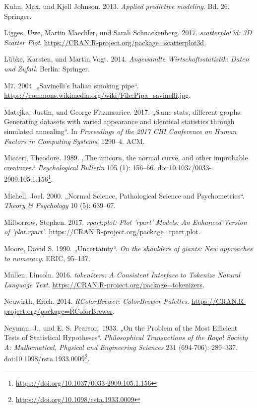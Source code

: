 \documentclass[12pt,ngerman,]{book}
\let\rmarkdownfootnote\footnote%
\def\footnote{\protect\rmarkdownfootnote}
\renewcommand{\href}[2]{#2\footnote{\url{#1}}}
\theoremstyle{definition}
\theoremstyle{definition}
\theoremstyle{remark}
\begin{document}
\hypertarget{ref-kuhn2013applied}{}
Kuhn, Max, und Kjell Johnson. 2013. \emph{Applied predictive modeling}.
Bd. 26. Springer.

\hypertarget{ref-R-scatterplot3d}{}
Ligges, Uwe, Martin Maechler, und Sarah Schnackenberg. 2017.
\emph{scatterplot3d: 3D Scatter Plot}.
\url{https://CRAN.R-project.org/package=scatterplot3d}.

\hypertarget{ref-lubke2014angewandte}{}
Lübke, Karsten, und Martin Vogt. 2014. \emph{Angewandte
Wirtschaftsstatistik: Daten und Zufall}. Berlin: Springer.

\hypertarget{ref-m7_savinellis_2004}{}
M7. 2004. „Savinelli's Italian smoking pipe``.
\url{https://commons.wikimedia.org/wiki/File:Pipa_savinelli.jpg}.

\hypertarget{ref-matejka2017same}{}
Matejka, Justin, und George Fitzmaurice. 2017. „Same stats, different
graphs: Generating datasets with varied appearance and identical
statistics through simulated annealing``. In \emph{Proceedings of the
2017 CHI Conference on Human Factors in Computing Systems}, 1290--4.
ACM.

\hypertarget{ref-Micceri1989}{}
Micceri, Theodore. 1989. „The unicorn, the normal curve, and other
improbable creatures.`` \emph{Psychological Bulletin} 105 (1): 156--66.
doi:\href{https://doi.org/10.1037/0033-2909.105.1.156}{10.1037/0033-2909.105.1.156}.

\hypertarget{ref-Michell2000}{}
Michell, Joel. 2000. „Normal Science, Pathological Science and
Psychometrics``. \emph{Theory \& Psychology} 10 (5): 639--67.

\hypertarget{ref-R-rpart.plot}{}
Milborrow, Stephen. 2017. \emph{rpart.plot: Plot 'rpart' Models: An
Enhanced Version of 'plot.rpart'}.
\url{https://CRAN.R-project.org/package=rpart.plot}.

\hypertarget{ref-moore1990uncertainty}{}
Moore, David S. 1990. „Uncertainty``. \emph{On the shoulders of giants:
New approaches to numeracy}. ERIC, 95--137.

\hypertarget{ref-R-tokenizers}{}
Mullen, Lincoln. 2016. \emph{tokenizers: A Consistent Interface to
Tokenize Natural Language Text}.
\url{https://CRAN.R-project.org/package=tokenizers}.

\hypertarget{ref-R-RColorBrewer}{}
Neuwirth, Erich. 2014. \emph{RColorBrewer: ColorBrewer Palettes}.
\url{https://CRAN.R-project.org/package=RColorBrewer}.

\hypertarget{ref-Neyman1933}{}
Neyman, J., und E. S. Pearson. 1933. „On the Problem of the Most
Efficient Tests of Statistical Hypotheses``. \emph{Philosophical
Transactions of the Royal Society A: Mathematical, Physical and
Engineering Sciences} 231 (694-706): 289--337.
doi:\href{https://doi.org/10.1098/rsta.1933.0009}{10.1098/rsta.1933.0009}.
\end{document}
